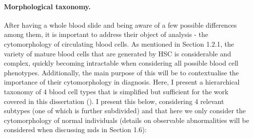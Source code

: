 \begin{figure}[!ht]
	\label{fig:whole-blood-slide}
\end{figure}
\paragraph{Morphological taxonomy.} After having a whole blood slide and being aware of a few possible differences among them, it is important to address their object of analysis - the cytomorphology of circulating blood cells. As mentioned in Section 1.2.1, the variety of mature blood cells that are generated by HSC is considerable and complex, quickly becoming intractable when considering all possible blood cell phenotypes. Additionally, the main purpose of this will be to contextualise the importance of their cytomorphology in diagnosis. Here, I present a hierarchical taxonomy of 4 blood cell types that is simplified but sufficient for the work covered in this dissertation (). I present this below, considering 4 relevant subtypes (one of which is further subdivided) and that here we only consider the cytomorphology of normal individuals (details on observable abnormalities will be considered when discussing \ac{mds} in Section 1.6):
